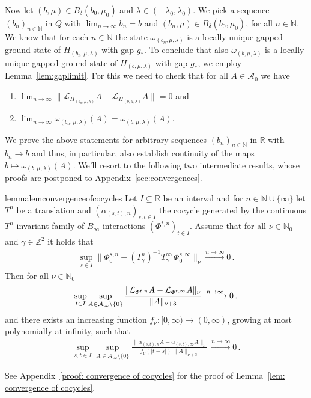 \documentclass[a4paper]{article}
\renewcommand{\Phi}{\varPhi}
\newcommand{\g}{\gamma}
\newcommand{\w}{\omega}
\newcommand{\N}{\mathbb{N}}
\newcommand{\Z}{\mathbb{Z}}
\newcommand{\mA}{\mathcal{A}}
\newcommand{\R}{\mathbb{R}}
\newcommand{\mL}{\mathcal{L}}
\DeclarePairedDelimiter\norm{\lVert}{\rVert}
\theoremstyle{plain}
\theoremstyle{definition}
\theoremstyle{remark}
\renewcommand{\(}{\left(}
\renewcommand{\)}{\right)}
\begin{document}
Now let $(b,\mu)\in B_{\delta}(b_0,\mu_0)$  and $\lambda \in (-\lambda_0,\lambda_0)$. We pick a sequence $(b_n)_{n\in\N}$ in $Q$ with $\lim_{n\to\infty}b_n=b$ and $(b_n,\mu)\in B_{\delta}(b_0,\mu_0)$, for all $n\in \N$. We know that for each $n\in \N$ the state $\w_{(b_n,\mu,\lambda)}$ is a locally unique gapped ground state of $H_{(b_n,\mu,\lambda)}$ with gap $g_*$. To conclude  that also $\w_{(b,\mu,\lambda)}$ is a locally unique gapped ground state of $H_{(b,\mu,\lambda)}$ with gap $g_*$, we employ Lemma~\ref{lem:gaplimit}. For this we need to check that for all $A\in\mA_0$ we have
\begin{enumerate}[label={(\roman*)}, ref={(\roman*)}]
\item \label{eq:b_conv_H} $\lim_{n\to\infty}\|\mL_{H_{(b_n,\mu,\lambda)}} A - \mL_{H_{(b,\mu,\lambda)}} A\|=0$ and 
\item \label{eq:b_conv_omega} $\lim_{n\to\infty} \w_{(b_n,\mu,\lambda)}(A) =  \w_{(b,\mu,\lambda)}(A).$
\end{enumerate}
We prove 
  the above statements for arbitrary sequences $(b_n)_{n\in\N}$ in $\R$ with $b_n\to b$ and thus, in particular, also establish continuity of the maps $b\mapsto \w_{(b,\mu,\lambda)}(A)$. We'll resort to the following two intermediate results, whose proofs are postponed to Appendix~\ref{sec:convergences}.



\begin{restatable}{lemma}{lemconvergenceofcocycles}
\label{lem: convergence of cocycles}
    Let $I \subseteq \R$ be an interval and for $n\in \N\cup \{\infty\}$ let $T^n$ be a translation and $(\alpha_{(s,t),n})_{s,t\in I}$  the cocycle generated by the continuous $T^n$-invariant family of $ B_\infty$-interactions $(\Phi^{t,n})_{t\in I}$. Assume that for all   $ \nu \in \N_0 $ and $ \g \in \Z^2 $ it holds that
    \begin{align*}
        \sup_{s\in I}\lVert \Phi_0^{s,n} - (T_\g^n)^{-1}T_\g^\infty \,  \Phi^{s,\infty}_0 \rVert_{\nu} \xrightarrow{n \to \infty} 0\, .
    \end{align*}
    Then for   all $\nu \in \N_0$
    \begin{align*}
       \sup_{t\in I} \sup_{A\in \mA_\infty\setminus\{0\}} \frac{\norm{\mL_{\Phi^{t,n}} A - \mL_{\Phi^{t,\infty}} A }_{\nu}}{\norm{A}_{\nu+3}} \xrightarrow{n\to\infty} 0\,.
    \end{align*}
    and there exists an increasing function $f_\nu:[0,\infty)\to (0,\infty)$, growing at most polynomially at infinity, such that 
    \begin{align*}
        \sup_{s,t \in I} \sup_{A\in \mA_\infty\setminus \{0\}} \frac{\lVert \alpha_{(s,t),n} A - \alpha_{(s,t),\infty} A \rVert_\nu}{ f_\nu(|t-s|) \,\lVert A \rVert_{\nu+3}}\,  \xrightarrow{n\to \infty} 0\, .
    \end{align*}
\end{restatable}
 \noindent  See Appendix~\ref{proof: convergence of cocycles} for the proof of Lemma~\ref{lem: convergence of cocycles}.
\end{document}
